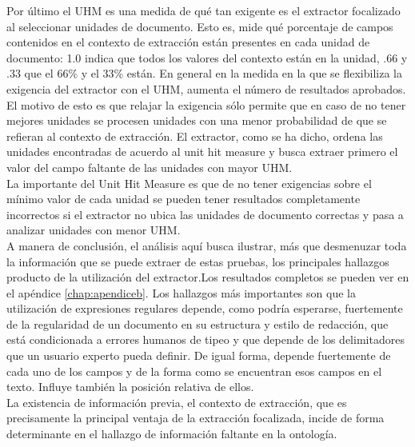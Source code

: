 Por último el UHM es una medida de qué tan exigente es el extractor focalizado al seleccionar unidades de documento. Esto es, mide qué porcentaje de campos contenidos en el contexto de extracción están presentes en cada unidad de documento: 1.0 indica que todos los valores del contexto están en la unidad, .66 y .33 que el 66\% y el 33\% están. En general en la medida en la que se flexibiliza la exigencia del extractor con el UHM, aumenta el número de resultados aprobados. El motivo de esto es que relajar la exigencia sólo permite que en caso de no tener mejores unidades se procesen unidades con una menor probabilidad de que se refieran al contexto de extracción. El extractor, como se ha dicho, ordena las unidades encontradas de acuerdo al unit hit measure y busca extraer primero el valor del campo faltante de las unidades con mayor UHM. \\

La importante del Unit Hit Measure es que de no tener exigencias sobre el mínimo valor de cada unidad se pueden tener resultados completamente incorrectos si el extractor no ubica las unidades de documento correctas y pasa a analizar unidades con menor UHM. \\

A manera de conclusión, el análisis aquí busca ilustrar, más que desmenuzar toda la información que se puede extraer de estas pruebas, los principales hallazgos producto de la utilización del extractor.Los resultados completos se pueden ver en el apéndice \ref{chap:apendiceb}.  Los hallazgos más importantes son que la utilización de expresiones regulares depende, como podría esperarse, fuertemente de la regularidad de un documento en su estructura y estilo de redacción, que está condicionada a errores humanos de tipeo y que depende de los delimitadores que un usuario experto pueda definir. De igual forma, depende fuertemente de cada uno de los campos y de la forma como se encuentran esos campos en el texto. Influye también la posición relativa de ellos.\\

La existencia de información previa, el contexto de extracción, que es precisamente la principal ventaja de la extracción focalizada, incide de forma determinante en el hallazgo de información faltante en la ontología.\\
